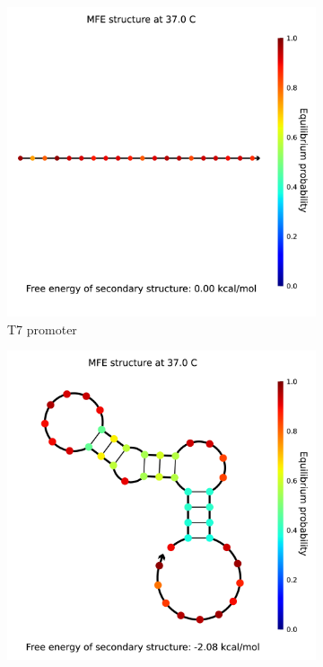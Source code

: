 \begin{figure}
\begin{subfigure}{.32\columnwidth}
  \centering
  \includegraphics[width=\linewidth]{images/0_analysis.png}
  \caption{T7 promoter}
\end{subfigure}%
\begin{subfigure}{.32\columnwidth}
  \centering
  \includegraphics[width=\linewidth]{images/1_analysis.png}

\end{subfigure}
\end{figure}
